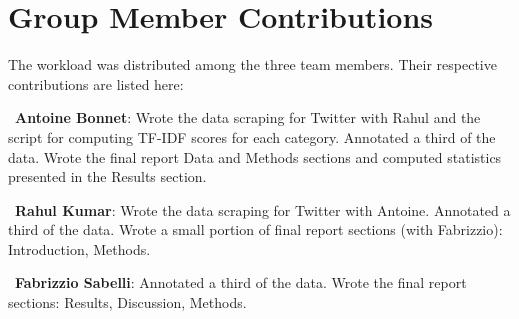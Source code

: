\documentclass[letterpaper]{article} %
\begin{document}

\section{Group Member Contributions}

The workload was distributed among the three team members. Their respective contributions are listed here: 

\  \textbf{Antoine Bonnet}: Wrote the data scraping for Twitter with Rahul and the script for computing TF-IDF scores for each category. Annotated a third of the data. Wrote the final report Data and Methods sections and computed statistics presented in the Results section.

\  \textbf{Rahul Kumar}: Wrote the data scraping for Twitter with Antoine.
Annotated a third of the data. Wrote a small portion of final report sections
(with Fabrizzio):  Introduction, Methods.

\  \textbf{Fabrizzio Sabelli}: Annotated a third of the data. Wrote the final report sections: Results, Discussion, Methods.
  
  
{}
\end{document}
